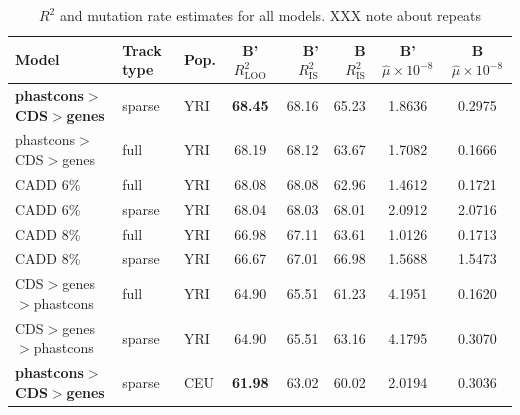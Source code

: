 \documentclass[11pt]{article}
\begin{document}
\begin{table}
\centering
\caption{$R^2$ and mutation rate estimates for all models. XXX note about repeats}
\begin{tabular}{lll|crr|cc}
    \textbf{Model} & \textbf{Track type} & \textbf{Pop.} & \textbf{B' $R_\text{LOO}^2$} & \textbf{B' $R_\text{IS}^2$} & \textbf{B $R_\text{IS}^2$} & \textbf{B' $\hat{\mu} \times 10^{-8}$} & \textbf{B $\hat{\mu} \times 10^{-8}$} \\[0.5ex] 
\hline
\hline
    \textbf{phastcons$>$CDS$>$genes} &            sparse &          YRI &                        \textbf{68.45} &             68.16 &            65.23 &                                 1.8636 &                                0.2975 \\
phastcons$>$CDS$>$genes &              full &          YRI &                        68.19 &             68.12 &            63.67 &                                 1.7082 &                                0.1666 \\
               CADD 6\% &              full &          YRI &                        68.08 &             68.08 &            62.96 &                                 1.4612 &                                0.1721 \\
               CADD 6\% &            sparse &          YRI &                        68.04 &             68.03 &            68.01 &                                 2.0912 &                                2.0716 \\
               CADD 8\% &              full &          YRI &                        66.98 &             67.11 &            63.61 &                                 1.0126 &                                0.1713 \\
               CADD 8\% &            sparse &          YRI &                        66.67 &             67.01 &            66.98 &                                 1.5688 &                                1.5473 \\
CDS$>$genes$>$phastcons &              full &          YRI &                        64.90 &             65.51 &            61.23 &                                 4.1951 &                                0.1620 \\
CDS$>$genes$>$phastcons &            sparse &          YRI &                        64.90 &             65.51 &            63.16 &                                 4.1795 &                                0.3070 \\
\textbf{phastcons$>$CDS$>$genes} &            sparse &          CEU &                        \textbf{61.98} &             63.02 &            60.02 &                                 2.0194 &                                0.3036 \\

\end{tabular}
\end{table}
\end{document}
